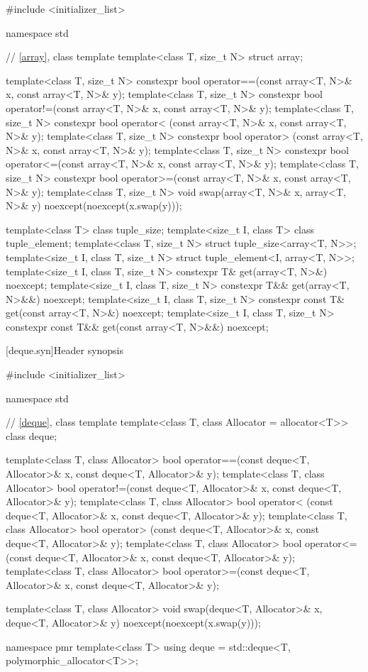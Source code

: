 %
\begin{codeblock}
#include <initializer_list>

namespace std {
  // \ref{array}, class template 
  template<class T, size_t N> struct array;

  template<class T, size_t N>
    constexpr bool operator==(const array<T, N>& x, const array<T, N>& y);
  template<class T, size_t N>
    constexpr bool operator!=(const array<T, N>& x, const array<T, N>& y);
  template<class T, size_t N>
    constexpr bool operator< (const array<T, N>& x, const array<T, N>& y);
  template<class T, size_t N>
    constexpr bool operator> (const array<T, N>& x, const array<T, N>& y);
  template<class T, size_t N>
    constexpr bool operator<=(const array<T, N>& x, const array<T, N>& y);
  template<class T, size_t N>
    constexpr bool operator>=(const array<T, N>& x, const array<T, N>& y);
  template<class T, size_t N>
    void swap(array<T, N>& x, array<T, N>& y) noexcept(noexcept(x.swap(y)));

  template<class T> class tuple_size;
  template<size_t I, class T> class tuple_element;
  template<class T, size_t N>
    struct tuple_size<array<T, N>>;
  template<size_t I, class T, size_t N>
    struct tuple_element<I, array<T, N>>;
  template<size_t I, class T, size_t N>
    constexpr T& get(array<T, N>&) noexcept;
  template<size_t I, class T, size_t N>
    constexpr T&& get(array<T, N>&&) noexcept;
  template<size_t I, class T, size_t N>
    constexpr const T& get(const array<T, N>&) noexcept;
  template<size_t I, class T, size_t N>
    constexpr const T&& get(const array<T, N>&&) noexcept;
}
\end{codeblock}

[deque.syn]{Header  synopsis}

%

\begin{codeblock}
#include <initializer_list>

namespace std {
  // \ref{deque}, class template 
  template<class T, class Allocator = allocator<T>> class deque;

  template<class T, class Allocator>
    bool operator==(const deque<T, Allocator>& x, const deque<T, Allocator>& y);
  template<class T, class Allocator>
    bool operator!=(const deque<T, Allocator>& x, const deque<T, Allocator>& y);
  template<class T, class Allocator>
    bool operator< (const deque<T, Allocator>& x, const deque<T, Allocator>& y);
  template<class T, class Allocator>
    bool operator> (const deque<T, Allocator>& x, const deque<T, Allocator>& y);
  template<class T, class Allocator>
    bool operator<=(const deque<T, Allocator>& x, const deque<T, Allocator>& y);
  template<class T, class Allocator>
    bool operator>=(const deque<T, Allocator>& x, const deque<T, Allocator>& y);

  template<class T, class Allocator>
    void swap(deque<T, Allocator>& x, deque<T, Allocator>& y)
      noexcept(noexcept(x.swap(y)));

  namespace pmr {
    template<class T>
      using deque = std::deque<T, polymorphic_allocator<T>>;
  }
}
\end{codeblock}

